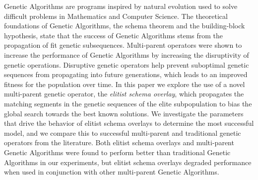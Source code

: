 Genetic Algorithms are programs inspired by natural evolution used to solve difficult problems in Mathematics and Computer Science. The theoretical foundations of Genetic Algorithms, the schema theorem and the building-block hypothesis, state that the success of Genetic Algorithms stems from the propagation of fit genetic subsequences. Multi-parent operators were shown to increase the performance of Genetic Algorithms by increasing the disruptivity of genetic operations. Disruptive genetic operators help prevent suboptimal genetic sequences from propagating into future generations, which leads to an improved fitness for the population over time. In this paper we explore the use of a novel multi-parent genetic operator, the \emph{elitist schema overlay}, which propagates the matching segments in the genetic sequences of the elite subpopulation to bias the global search towards the best known solutions. We investigate the parameters that drive the behavior of elitist schema overlays to determine the most successful model, and we compare this to successful multi-parent and traditional genetic operators from the literature. Both elitist schema overlays and multi-parent Genetic Algorithms were found to perform better than traditional Genetic Algorithms in our experiments, but elitist schema overlays degraded performance when used in conjunction with other multi-parent Genetic Algorithms.